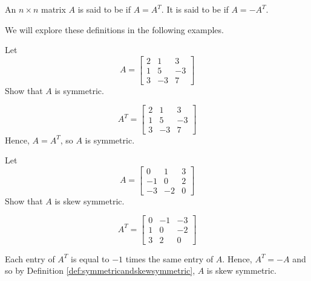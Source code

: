 \documentclass{ximera}
\begin{document}
\begin{definition}\label{def:symmetricandskewsymmetric}
An $n\times n$ matrix $A$ is said to be
 if $A=A^{T}.$ It is said to be
 if $A=-A^{T}.$
\end{definition}

We will explore these definitions in the following examples.

\begin{example}\label{ex:symmetricmatrix}
Let
\begin{equation*}
A=
\begin{bmatrix}
2 & 1 & 3 \\
1 & 5 & -3 \\
3 & -3 & 7
\end{bmatrix}
\end{equation*}
Show that $A$ is symmetric. 
\begin{explanation}
\begin{equation*}
A^{T} =
\begin{bmatrix}
2 & 1 & 3 \\
1 & 5 & -3 \\
3 & -3 & 7
\end{bmatrix}
\end{equation*}
Hence, $A = A^{T}$, so $A$ is symmetric.
\end{explanation}
\end{example}

\begin{example}\label{ex:skewsymmetricmatrix}
Let
\begin{equation*}
A=
\begin{bmatrix}
0 & 1 & 3 \\
-1 & 0 & 2 \\
-3 & -2 & 0
\end{bmatrix}
\end{equation*}
Show that $A$ is skew symmetric.
\begin{explanation} 
\begin{equation*}
A^{T} = 
\begin{bmatrix}
0 & -1 & -3\\
1 &  0 & -2\\
3 &  2 &  0
\end{bmatrix}
\end{equation*}

Each entry of $A^T$ is equal to $-1$ times the same entry of $A$. 
Hence, $A^{T} = - A$ and so by Definition \ref{def:symmetricandskewsymmetric}, $A$ is skew symmetric. 
\end{explanation}
\end{example}
\end{document}
